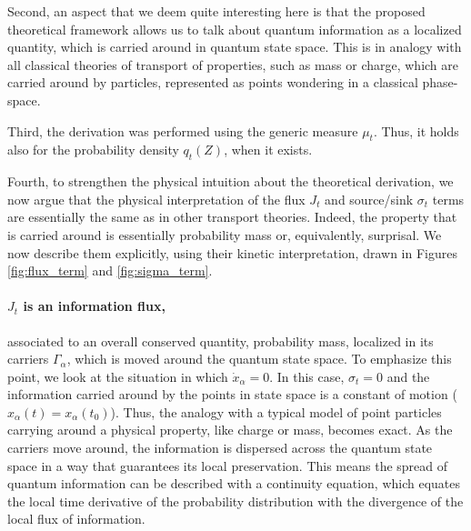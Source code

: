 \documentclass[draft,nofootinbib,pre,twocolumn,showpacs,showkeys,preprintnumbers,floatfix]{revtex4-1}
\newcommand{\1}{\mathbbm{1}}
\begin{document}
Second, an aspect that we deem quite interesting here is that the proposed theoretical framework allows us to talk 
about quantum information as a localized quantity, which is carried around in quantum state space. This is in analogy 
with all classical theories of transport of properties, such as mass or charge, which are carried around by 
particles, represented as points wondering in a classical phase-space. 

Third, the derivation was performed using the generic measure $\mu_t$. Thus, it holds also for the probability
density $q_t(Z)$, when it exists.

Fourth, to strengthen the physical intuition about the theoretical derivation, we now argue that the physical interpretation 
of the flux $J_t$ and source/sink $\sigma_t$ terms are essentially the same as in other transport theories. Indeed, the 
property that is carried around is essentially probability mass or, equivalently, surprisal. We now describe them explicitly, using 
their kinetic interpretation, drawn in Figures \ref{fig:flux_term} and \ref{fig:sigma_term}. 

\paragraph*{$J_t$ is an information flux,} associated to an overall conserved quantity, probability mass, localized in its carriers $\Gamma_\alpha$, which 
is moved around the quantum state space. To emphasize this point, we look at the situation in which $\dot{x}_\alpha = 0$. 
In this case, $\sigma_t=0$ and the information carried around by the points in state space is a constant of motion 
($x_\alpha(t)= x_\alpha(t_0)$). Thus, the analogy with a typical model of point particles carrying around a physical property, 
like charge or mass, becomes exact. As the carriers move around, the information is dispersed across the quantum 
state space in a way that guarantees its local preservation. This means the spread of quantum information can be described 
with a continuity equation, which equates the local time derivative of the probability distribution with the divergence of the 
local flux of information.
\end{document}
